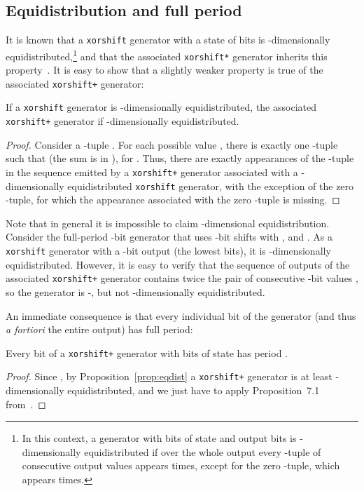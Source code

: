 \documentclass{acmsmalltr}
\newcommand{\xorshift}[1][]{\texttt{xorshift#1}\xspace}
\newcommand{\xorshifts}[1][]{\texttt{xorshift#1*}\xspace}
\newcommand{\xorshiftp}[1][]{\texttt{xorshift#1+}\xspace}
\begin{document}
\subsection{Equidistribution and full period}
\label{sec:ed}

It is known that a \xorshift generator with a state of  bits is
-dimensionally equidistributed,\footnote{In this context, a generator with
 bits of state and  output bits is -dimensionally equidistributed if
over the whole output every -tuple of consecutive output values appears  times, except
for the zero -tuple, which appears  times.} and that the
associated \xorshifts generator inherits this property~\cite{VigEEMXGS}. It is easy to show that a slightly weaker property is true of the associated \xorshiftp generator:

\begin{proposition}
\label{prop:eqdist}
If a \xorshift generator is -dimensionally equidistributed, the associated
\xorshiftp generator if -dimensionally equidistributed.
\end{proposition}
\begin{proof}
Consider a -tuple . For each possible
value , there is exactly one -tuple 
such that  (the sum is in ), for . Thus,
there are exactly  appearances of the -tuple  in the sequence emitted by a \xorshiftp generator
associated with a -dimensionally equidistributed \xorshift generator, with
the exception of the zero -tuple, for which the appearance associated
with the zero -tuple is missing.
\end{proof}

Note that in general it is impossible to claim -dimensional equidistribution.
Consider the full-period -bit generator that uses -bit shifts with
,  and . As a \xorshift
generator with a -bit output (the lowest bits), it is -dimensionally
equidistributed.
However, it is easy to verify that the sequence of outputs of the associated \xorshiftp generator contains twice the pair
of consecutive -bit values , so the generator is -, but not
-dimensionally equidistributed.

An immediate consequence is that every individual bit of the generator 
(and thus \textit{a fortiori} the entire output) has full period:

\begin{proposition}
Every bit of a \xorshiftp generator with  bits of state has period
.
\end{proposition}
\begin{proof}
Since , by Proposition~\ref{prop:eqdist} a \xorshiftp generator is at
least -dimensionally equidistributed, and we just have to apply
Proposition~7.1 from~\cite{VigEEMXGS}.
\end{proof}
\end{document}
